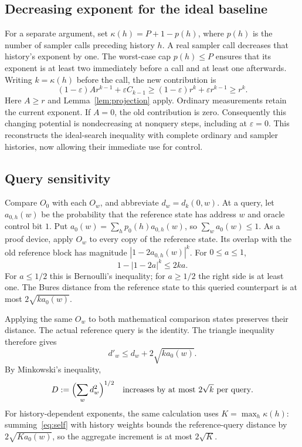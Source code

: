 \documentclass[11pt]{article}
\theoremstyle{remark}
\newcommand{\eps}{\varepsilon}
\begin{document}
\subsection{Decreasing exponent for the ideal baseline}
For a separate argument, set $\kappa(h)=P+1-p(h)$, where $p(h)$ is the number
of sampler calls preceding history $h$. A real sampler call decreases that
history's exponent by one. The worst-case cap $p(h)\le P$ ensures that its
exponent is at least two immediately before a call and at least one afterwards.
Writing $k=\kappa(h)$ before the call, the new contribution is
\begin{equation}\label{eq:decreasing}
 (1-\eps)Ar^{k-1}+\eps C_{k-1}
 \ge(1-\eps)r^k+\eps r^{k-1}\ge r^k.
\end{equation}
Here $A\ge r$ and Lemma~\ref{lem:projection} apply. Ordinary measurements
retain the current exponent. If $A=0$, the old contribution is zero.
Consequently this changing potential is
nondecreasing at nonquery steps, including at $\eps=0$. This reconstructs
the ideal-search inequality with complete ordinary and sampler histories,
now allowing their immediate use for control.

\subsection{Query sensitivity}
Compare $O_0$ with each $O_w$, and abbreviate $d_w=d_k(0,w)$.
At a query, let $a_{0,h}(w)$ be the probability that the reference state
has address $w$ and oracle control bit $1$. Put
$a_0(w)=\sum_h p_0(h)a_{0,h}(w)$, so $\sum_w a_0(w)\le1$.
As a proof device, apply $O_w$ to every copy of the reference state.
Its overlap with the old reference block has magnitude
$|1-2a_{0,h}(w)|^k$. For $0\le a\le1$,
\begin{equation}\label{eq:self}
 1-|1-2a|^k\le2ka.
\end{equation}
For $a\le1/2$ this is Bernoulli's inequality; for $a\ge1/2$ the right side
is at least one. The Bures distance from the reference state to this
queried counterpart is at most $2\sqrt{k a_0(w)}$.

Applying the same $O_w$ to both mathematical comparison states preserves
their distance. The actual reference query is the identity. The triangle
inequality therefore gives
\begin{equation}
 d'_w\le d_w+2\sqrt{k a_0(w)}.
\end{equation}
By Minkowski's inequality,
\begin{equation}\label{eq:D}
 D:=\Bigl(\sum_wd_w^2\Bigr)^{1/2}
 \quad\text{increases by at most }2\sqrt{k}\text{ per query}.
\end{equation}
For history-dependent exponents, the same calculation uses
$K=\max_h\kappa(h)$: summing~\eqref{eq:self} with history weights bounds
the reference-query distance by $2\sqrt{K a_0(w)}$, so the aggregate
increment is at most $2\sqrt K$.
\end{document}
